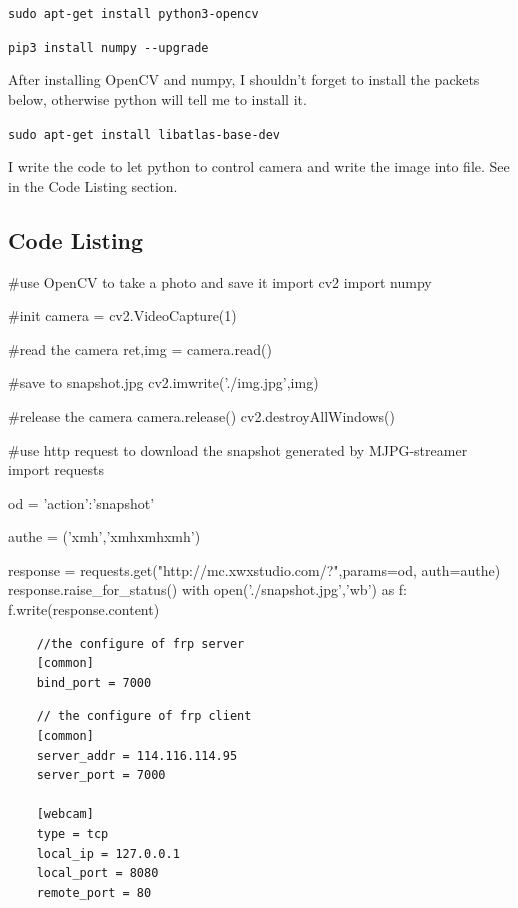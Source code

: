 \documentclass{article}
\begin{document}
\verb|sudo apt-get install python3-opencv|

\verb|pip3 install numpy --upgrade|

After installing OpenCV and numpy, I shouldn't forget to install the packets below, otherwise python will tell me to install it.

\verb|sudo apt-get install libatlas-base-dev|

I write the code to let python to control camera and write the image into file. See in the Code Listing section.




\begin{appendices}
\section{Code Listing}
\begin{python}
	#use OpenCV to take a photo and save it
	import cv2
	import numpy

	#init
	camera = cv2.VideoCapture(1)

	#read the camera
	ret,img = camera.read()

	#save to snapshot.jpg
	cv2.imwrite('./img.jpg',img)

	#release the camera
	camera.release()
	cv2.destroyAllWindows()
\end{python}
\begin{python}
	#use http request to download the snapshot generated by MJPG-streamer
	import requests

	od = {'action':'snapshot'}

	authe = ('xmh','xmhxmhxmh')

	response = requests.get("http://mc.xwxstudio.com/?",params=od, auth=authe)
	response.raise_for_status()
	with open('./snapshot.jpg','wb') as f:
	    f.write(response.content)
\end{python}
\begin{lstlisting}
	//the configure of frp server
	[common]
	bind_port = 7000
\end{lstlisting}
\begin{lstlisting}
	// the configure of frp client
	[common]
	server_addr = 114.116.114.95
	server_port = 7000

	[webcam]
	type = tcp
	local_ip = 127.0.0.1
	local_port = 8080
	remote_port = 80
\end{lstlisting}
\end{appendices}
\end{document}
